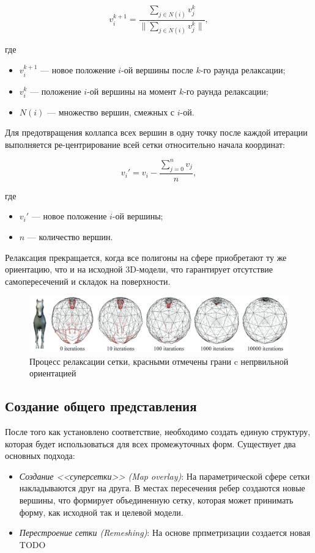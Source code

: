 	\begin{equation}
		v_i^{k + 1} = \frac{\sum_{j \in N(i)} v_j^{k}}{\parallel \sum_{j \in N(i)} v_j^{k} \parallel}, 
	\end{equation}
	
	где
	\begin{itemize}
		\item $v_i^{k + 1}$ --- новое положение $i$-ой вершины после $k$-го раунда релаксации;
		\item $v_i^{k}$ --- положение $i$-ой вершины на момент $k$-го раунда релаксации;
		\item $N(i)$ --- множество вершин, смежных с $i$-ой.
	\end{itemize}
	
	Для предотвращения коллапса всех вершин в одну точку после каждой итерации выполняется ре-центрирование всей сетки относительно начала координат:
	
	\begin{equation}
		v_i' = v_i - \frac{\sum_{j = 0}^{n} v_j}{n},
	\end{equation}
	
	где
	\begin{itemize}
		\item $v_i'$ --- новое положение $i$-ой вершины;
		\item $n$ --- количество вершин.
	\end{itemize}
	
	Релаксация прекращается, когда все полигоны на сфере приобретают ту же ориентацию, что и на исходной 3D-модели, что гарантирует отсутствие самопересечений и складок на поверхности.
	
	
	\begin{figure}[H]
		\centering
		\includegraphics[width=\textwidth]{../inc/images/relaxation}
		\caption{Процесс релаксации сетки, красными отмечены грани c непрвильной ориентацией}
		\label{fig:relaxation}
	\end{figure}
	
	
    \subsection{Создание общего представления}
    После того как установлено соответствие, необходимо создать единую структуру, которая будет использоваться для всех промежуточных форм. Существует два основных подхода:
    \begin{itemize}
        \item \textit{Создание <<суперсетки>> (Map overlay)}\cite{alexa}: На параметрической сфере сетки накладываются друг на друга. В местах пересечения ребер создаются новые вершины, что формирует объединенную сетку, которая может принимать форму, как исходной так и целевой модели.
        \item \textit{Перестроение сетки (Remeshing)}\cite{alexa}: На основе прпметризации создается новая TODO
    \end{itemize}

